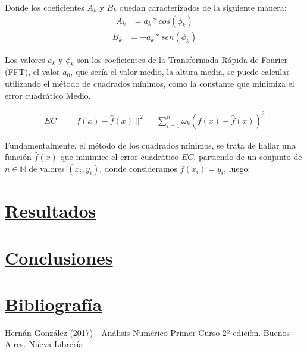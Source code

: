 \documentclass[10pt,a4paper]{article}
\numberwithin{equation}{section}
\numberwithin{figure}{section}
\numberwithin{table}{section}
\begin{document}
Donde los coeficientes $A_k$ y $B_k$ quedan caracterizados de la siguiente manera:
\begin{equation}\label{eqn:eq_3_1}
    \begin{split}
        A_k &= a_k*cos(\phi_k)
    \end{split}
\end{equation}
\begin{equation}\label{eqn:eq_3_2}
    \begin{split}
        B_k &= -a_k*sen(\phi_k)
    \end{split}
\end{equation}

Los valores $a_k$ y $\phi_k$ son los coeficientes de la Transformada Rápida de Fourier (FFT), el valor $a_0$, que sería el valor medio, la altura media, se puede calcular utilizando el método de cuadrados mínimos, como la constante que minimiza el error cuadrático Medio.



\begin{equation}\label{eq_4}
    \begin{split}
        EC = \parallel f(x) - \hat{f}(x) \parallel^2 = \sum_{i=1}^{n} \omega_k (f(x)-\hat{f}(x))^2
    \end{split}
\end{equation}

Fundamentalmente, el método de los cuadrados mínimos, se trata de hallar una función $\hat{f}(x)$ que minimice el error cuadrático $EC$, partiendo de un conjunto de $n \in \mathbb{N}$ de valores $(x_i,y_i)$, donde consideramos $f(x_i) = y_i$, luego:







    
\section{\underline{Resultados}}


\section{\underline{Conclusiones}}

\section{\underline{Bibliografía}}
\begin{thebibliography}{9}

Hernán González (2017) - Análisis Numérico Primer Curso 2º ediciòn. Buenos Aires. Nueva Librería. 
\end{thebibliography}
\end{document}
